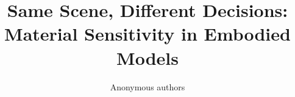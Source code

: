\documentclass{article}
\title{Same Scene, Different Decisions:\\Material Sensitivity in Embodied Models}
\author{Anonymous authors}
\begin{document}
\raggedbottom
\maketitle








\FloatBarrier
\label{page:main-end}



\clearpage
\appendix

\end{document}
